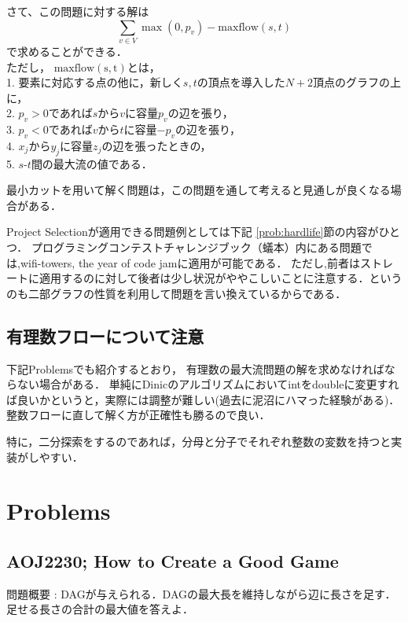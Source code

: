 \documentclass[13pt]{jarticle}
\theoremstyle{nonitalic} %
\begin{document}
さて、この問題に対する解は
\[ \sum_{v \in V } \max(0,p_v) - \mathrm{maxflow}(s,t) \]
で求めることができる．\\
ただし， $\mathrm{maxflow(s,t)}$とは，\\
1. 要素に対応する点の他に，新しく$s,t$の頂点を導入した$N+2$頂点のグラフの上に，\\
2. $p_v>0$であれば$s$から$v$に容量$p_v$の辺を張り，\\
3. $p_v<0$であれば$v$から$t$に容量$-p_v$の辺を張り，\\
4. $x_j$から$y_j$に容量$z_j$の辺を張ったときの，\\
5. $s$-$t$間の最大流の値である．


最小カットを用いて解く問題は，この問題を通して考えると見通しが良くなる場合がある．

Project Selectionが適用できる問題例としては下記 \ref{prob:hardlife}節の内容がひとつ．
プログラミングコンテストチャレンジブック（蟻本）内にある問題では,wifi-towers, the year of code jamに適用が可能である．
ただし,前者はストレートに適用するのに対して後者は少し状況がややこしいことに注意する．というのも二部グラフの性質を利用して問題を言い換えているからである．


\subsection{有理数フローについて注意}

下記Problemsでも紹介するとおり， 有理数の最大流問題の解を求めなければならない場合がある． 単純にDinicのアルゴリズムにおいてintをdoubleに変更すれば良いかというと，実際には調整が難しい(過去に泥沼にハマった経験がある)． 整数フローに直して解く方が正確性も勝るので良い．

特に，二分探索をするのであれば，分母と分子でそれぞれ整数の変数を持つと実装がしやすい．



\section{Problems}

\subsection{AOJ2230; How to Create a Good Game}
\label{prob:aoj2230}

問題概要 : DAGが与えられる．DAGの最大長を維持しながら辺に長さを足す．足せる長さの合計の最大値を答えよ．
\end{document}
